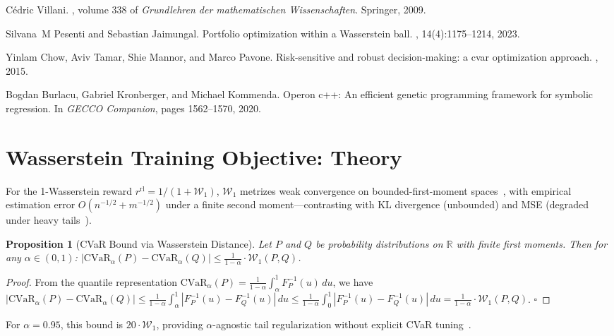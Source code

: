 \documentclass{elektr}
\theoremstyle{corollary}
\theoremstyle{lemma}
\theoremstyle{proposition}
\newtheorem{proposition}{Proposition}
\theoremstyle{axiom}
\theoremstyle{conjecture}
\theoremstyle{example}
\theoremstyle{definition}
\theoremstyle{remark}
\begin{document}
\begin{thebibliography}{10}
C{\'e}dric Villani.
, volume 338 of {\em Grundlehren der mathematischen Wissenschaften}.
\newblock Springer, 2009.

Silvana~M Pesenti and Sebastian Jaimungal.
\newblock Portfolio optimization within a {W}asserstein ball.
, 14(4):1175--1214, 2023.

Yinlam Chow, Aviv Tamar, Shie Mannor, and Marco Pavone.
\newblock Risk-sensitive and robust decision-making: a cvar optimization approach.
, 2015.

Bogdan Burlacu, Gabriel Kronberger, and Michael Kommenda.
\newblock Operon c++: An efficient genetic programming framework for symbolic regression.
\newblock In {\em GECCO Companion}, pages 1562--1570, 2020.

\end{thebibliography}


\appendix
\section{Wasserstein Training Objective: Theory}
\label{app:wasserstein_theory}

For the 1-Wasserstein reward $r^{\text{rl}} = 1/(1 + \mathcal{W}_1)$, $\mathcal{W}_1$ metrizes weak convergence on bounded-first-moment spaces~\cite{villani2009optimal}, with empirical estimation error $O(n^{-1/2} + m^{-1/2})$ under a finite second moment---contrasting with KL divergence (unbounded) and MSE (degraded under heavy tails~\cite{cont2001empirical}).

\begin{proposition}[CVaR Bound via Wasserstein Distance]
Let $P$ and $Q$ be probability distributions on $\mathbb{R}$ with finite first moments. Then for any $\alpha \in (0,1)$: $|\text{CVaR}_\alpha(P) - \text{CVaR}_\alpha(Q)| \leq \frac{1}{1-\alpha} \cdot \mathcal{W}_1(P, Q)$.
\end{proposition}

\begin{proof}
From the quantile representation $\text{CVaR}_\alpha(P) = \frac{1}{1-\alpha} \int_{\alpha}^{1} F_P^{-1}(u) \, du$, we have $|\text{CVaR}_\alpha(P) - \text{CVaR}_\alpha(Q)| \leq \frac{1}{1-\alpha} \int_{\alpha}^{1} |F_P^{-1}(u) - F_Q^{-1}(u)| \, du \leq \frac{1}{1-\alpha} \int_{0}^{1} |F_P^{-1}(u) - F_Q^{-1}(u)| \, du = \frac{1}{1-\alpha} \cdot \mathcal{W}_1(P, Q)$. \quad $\square$
\end{proof}

For $\alpha = 0.95$, this bound is $20 \cdot \mathcal{W}_1$, providing $\alpha$-agnostic tail regularization without explicit CVaR tuning~\cite{chow2015cvar}.
\end{document}

